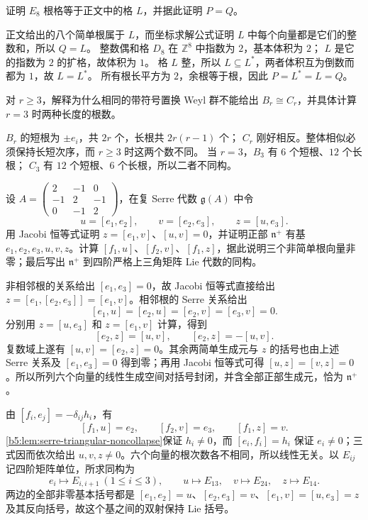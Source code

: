 \begin{exercise}\label{b5:ex:17-e8-lattice}
	证明 \(E_8\) 根格等于正文中的格 \(L\)，并据此证明 \(P=Q\)。
\end{exercise}
\begin{solution}
	正文给出的八个简单根属于 \(L\)，而坐标求解公式证明 \(L\) 中每个向量都是它们的整数和，所以 \(Q=L\)。 整数偶和格 \(D_8\) 在 \(\mathbb Z^8\) 中指数为 \(2\)，基本体积为 \(2\)； \(L\) 是它的指数为 \(2\) 的扩格，故体积为 \(1\)。 格 \(L\) 整，所以 \(L\subseteq L^*\)，两者体积互为倒数而都为 \(1\)，故 \(L=L^*\)。 所有根长平方为 \(2\)，余根等于根，因此 \(P=L^*=L=Q\)。
\end{solution}

\begin{exercise}\label{b5:ex:17-same-weyl-not-roots}
	对 \(r\geq3\)，解释为什么相同的带符号置换 Weyl 群不能给出 \(B_r\cong C_r\)，并具体计算 \(r=3\) 时两种长度的根数。
\end{exercise}
\begin{solution}
	\(B_r\) 的短根为 \(\pm e_i\)，共 \(2r\) 个，长根共 \(2r(r-1)\) 个； \(C_r\) 刚好相反。整体相似必须保持长短次序，而 \(r\geq3\) 时这两个数不同。 当 \(r=3\)，\(B_3\) 有 \(6\) 个短根、\(12\) 个长根； \(C_3\) 有 \(12\) 个短根、\(6\) 个长根，所以二者不同构。
\end{solution}

\begin{optionalexercise}\label{b5:ex:17-serre-a2}
	设 \(A=\left(\begin{smallmatrix}2&-1&0\\-1&2&-1\\0&-1&2\end{smallmatrix}\right)\)，在复 Serre 代数 \(\mathfrak g(A)\) 中令
	\[
		u=[e_1,e_2],\qquad v=[e_2,e_3],\qquad z=[u,e_3].
	\]
	用 Jacobi 恒等式证明 \(z=[e_1,v]\)、\([u,v]=0\)，并证明正部 \(\mathfrak n^+\) 有基 \(e_1,e_2,e_3,u,v,z\)。计算 \([f_1,u]\)、\([f_2,v]\)、\([f_1,z]\)，据此说明三个非简单根向量非零；最后写出 \(\mathfrak n^+\) 到四阶严格上三角矩阵 Lie 代数的同构。
\end{optionalexercise}
\begin{solution}
	非相邻根的关系给出 \([e_1,e_3]=0\)，故 Jacobi 恒等式直接给出 \(z=[e_1,[e_2,e_3]]=[e_1,v]\)。相邻根的 Serre 关系给出
	\[
		[e_1,u]=[e_2,u]=[e_2,v]=[e_3,v]=0.
	\]
	分别用 \(z=[u,e_3]\) 和 \(z=[e_1,v]\) 计算，得到
	\[
		[e_2,z]=[u,v],\qquad [e_2,z]=-[u,v].
	\]
	复数域上遂有 \([u,v]=[e_2,z]=0\)。其余两简单生成元与 \(z\) 的括号也由上述 Serre 关系及 \([e_1,e_3]=0\) 得到零；再用 Jacobi 恒等式可得 \([u,z]=[v,z]=0\)。所以所列六个向量的线性生成空间对括号封闭，并含全部正部生成元，恰为 \(\mathfrak n^+\)。

	由 \([f_i,e_j]=-\delta_{ij}h_i\)，有
	\[
		[f_1,u]=e_2,\qquad [f_2,v]=e_3,\qquad [f_1,z]=v.
	\]
	\cref{b5:lem:serre-triangular-noncollapse}保证 \(h_i\ne0\)，而 \([e_i,f_i]=h_i\) 保证 \(e_i\ne0\)；三式因而依次给出 \(u,v,z\ne0\)。六个向量的根次数各不相同，所以线性无关。以 \(E_{ij}\) 记四阶矩阵单位，所求同构为
	\[
		e_i\longmapsto E_{i,i+1}\ (1\le i\le3),\qquad u\longmapsto E_{13},\quad v\longmapsto E_{24},\quad z\longmapsto E_{14}.
	\]
	两边的全部非零基本括号都是 \([e_1,e_2]=u\)、\([e_2,e_3]=v\)、\([e_1,v]=[u,e_3]=z\) 及其反向括号，故这个基之间的双射保持 Lie 括号。
\end{solution}

